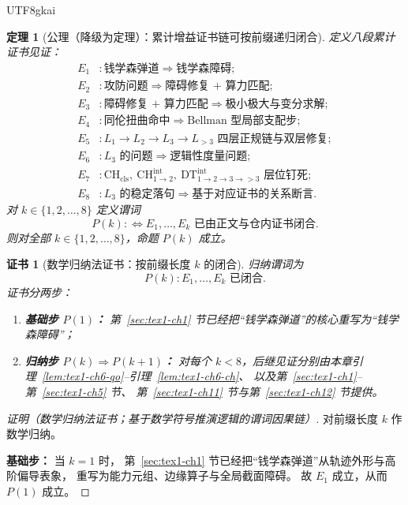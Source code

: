 \documentclass[12pt]{article}
\newtheorem{theorem}{定理}[section]
\newtheorem{Certificate}{证书}[section]
\begin{document}
\begin{CJK*}{UTF8}{gkai}
\begin{theorem}[公理（降级为定理）：累计增益证书链可按前缀递归闭合]
\label{thm:tex1-ch6-induction}
定义八段累计证书见证：
\[
\begin{aligned}
  E_1 &: \text{钱学森弹道}\Longrightarrow \text{钱学森障碍};\\
  E_2 &: \text{攻防问题}\Longrightarrow \text{障碍修复 + 算力匹配};\\
  E_3 &: \text{障碍修复 + 算力匹配}\Longrightarrow \text{极小极大与变分求解};\\
  E_4 &: \text{同伦扭曲命中}\Longrightarrow \text{Bellman 型局部支配步};\\
  E_5 &: L_1\to L_2\to L_3\to L_{>3}\text{ 四层正规链与双层修复};\\
  E_6 &: L_3\text{ 的问题}\Longrightarrow \text{逻辑性度量问题};\\
  E_7 &: \mathrm{CH}_{\mathrm{cls}},\ \mathrm{CH}^{\mathrm{int}}_{1\to 2},\ \mathrm{DT}^{\mathrm{int}}_{1\to 2\to 3\to
    >3}\text{ 层位钉死};\\
  E_8 &: L_3\text{ 的稳定落句}\Longrightarrow \text{基于对应证书的关系断言}.
\end{aligned}
\]
对 \(k\in\{1,2,\dots,8\}\) 定义谓词
\[
  P(k)
  :
  \Longleftrightarrow
  E_1,\dots,E_k\text{ 已由正文与仓内证书闭合}.
\]
则对全部 \(k\in\{1,2,\dots,8\}\)，命题 \(P(k)\) 成立。
\end{theorem}

\begin{Certificate}[数学归纳法证书：按前缀长度 \(k\) 的闭合]
\label{cert:tex1-ch6-induction}
归纳谓词为
\[
  P(k):
  E_1,\dots,E_k\text{ 已闭合}.
\]
证书分两步：
\begin{enumerate}
  \item \textbf{基础步 \(P(1)\)：}
  第~\ref{sec:tex1-ch1} 节已经把“钱学森弹道”的核心重写为“钱学森障碍”；
  \item \textbf{归纳步 \(P(k)\Rightarrow P(k+1)\)：}
  对每个 \(k<8\)，后继见证分别由本章引理~\ref{lem:tex1-ch6-qo}--引理~\ref{lem:tex1-ch6-ch}、
  以及第~\ref{sec:tex1-ch1}--第~\ref{sec:tex1-ch5} 节、
  第~\ref{sec:tex1-ch11} 节与第~\ref{sec:tex1-ch12} 节提供。
\end{enumerate}
\end{Certificate}

\begin{proof}[证明（数学归纳法证书；基于数学符号推演逻辑的谓词因果链）]
对前缀长度 \(k\) 作数学归纳。

\textbf{基础步：}
当 \(k=1\) 时，
第~\ref{sec:tex1-ch1} 节已经把“钱学森弹道”从轨迹外形与高阶偏导表象，
重写为能力元组、边缘算子与全局截面障碍。
故 \(E_1\) 成立，从而 \(P(1)\) 成立。


\end{proof}
\end{CJK*}
\end{document}

